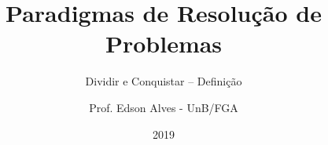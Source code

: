 \title{Paradigmas de Resolução de Problemas}
\subtitle{Dividir e Conquistar -- Definição}
\author{Prof. Edson Alves - UnB/FGA}
\date{2019}
